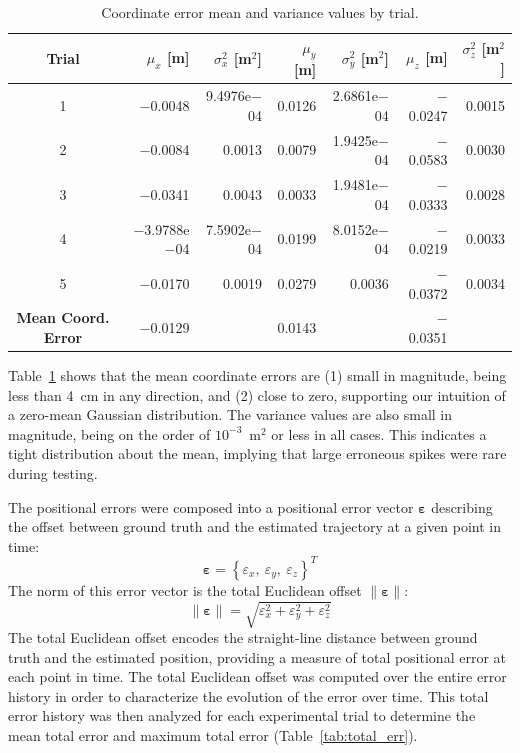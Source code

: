 \begin{table}[h]\centering
\caption[Coordinate Error Mean and Variance Values]{Coordinate error mean and variance values by trial.}
\begin{tabular}[c]{crr|rr|rr}
\toprule
Trial & $\mu_{x}$ [m] & $\sigma_{x}^{2}$ [m$^{2}$] & $\mu_{y}$ [m] & $\sigma_{y}^{2}$ [m$^{2}$] & $\mu_{z}$ [m] & $\sigma_{z}^{2}$ [m$^{2}$] \\
\hline
1 & $-$0.0048 & 9.4976e$-$04 & 0.0126 & 2.6861e$-$04 & $-$0.0247 & 0.0015 \\
2 & $-$0.0084 & 0.0013 & 0.0079 & 1.9425e$-$04 & $-$0.0583 & 0.0030 \\
3 & $-$0.0341 & 0.0043 & 0.0033 & 1.9481e$-$04 & $-$0.0333 & 0.0028 \\
4 & $-$3.9788e$-$04 & 7.5902e$-$04 & 0.0199 & 8.0152e$-$04 & $-$0.0219 & 0.0033 \\
5 & $-$0.0170 & 0.0019 & 0.0279 & 0.0036 & $-$0.0372 & 0.0034 \\
\hline
\textbf{Mean Coord. Error} & $-$0.0129 &  & 0.0143 &  & $-$0.0351 & \\
\bottomrule
\end{tabular}
\label{tab:means_and_vars}
\end{table}

Table~\ref{tab:means_and_vars} shows that the mean coordinate errors are (1) small in magnitude, being less than 4~cm in any direction, and (2) close to zero, supporting our intuition of a zero-mean Gaussian distribution. The variance values are also small in magnitude, being on the order of $10^{-3}$~m$^{2}$ or less in all cases. This indicates a tight distribution about the mean, implying that large erroneous spikes were rare during testing.

The positional errors were composed into a positional error vector $\bm{\varepsilon}$ describing the offset between ground truth and the estimated trajectory at a given point in time:
%
\begin{equation}
\bm{\varepsilon} = \left\lbrace \varepsilon_{x},\ \varepsilon_{y},\ \varepsilon_{z} \right\rbrace ^{T}
\end{equation}
%
The norm of this error vector is the total Euclidean offset $\| \bm{\varepsilon} \|$:
%
\begin{equation}
\| \bm{\varepsilon} \| = \sqrt{\varepsilon_{x}^{2} + \varepsilon_{y}^{2} + \varepsilon_{z}^{2}} 
\end{equation}
%
The total Euclidean offset encodes the straight-line distance between ground truth and the estimated position, providing a measure of total positional error at each point in time. The total Euclidean offset was computed over the entire error history in order to characterize the evolution of the error over time. This total error history was then analyzed for each experimental trial to determine the mean total error and maximum total error (Table~\ref{tab:total_err}).

